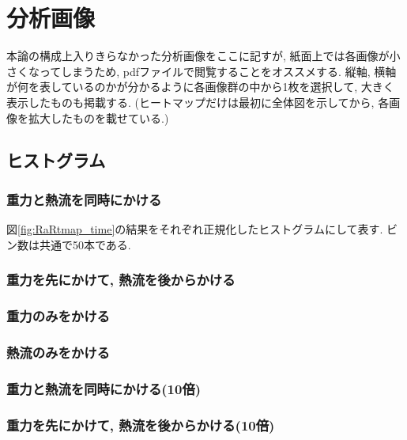 \chapter{分析画像}\label{ap:analysis}

本論の構成上入りきらなかった分析画像をここに記すが, 紙面上では各画像が小さくなってしまうため, pdfファイルで閲覧することをオススメする. 縦軸, 横軸が何を表しているのかが分かるように各画像群の中から1枚を選択して, 大きく表示したものも掲載する. (ヒートマップだけは最初に全体図を示してから, 各画像を拡大したものを載せている.)

\section{ヒストグラム}

\subsection{重力と熱流を同時にかける}

図\ref{fig:RaRtmap_time}の結果をそれぞれ正規化したヒストグラムにして表す. ビン数は共通で50本である.



\subsection{重力を先にかけて, 熱流を後からかける}



\subsection{重力のみをかける} 

 

\subsection{熱流のみをかける}



\subsection{重力と熱流を同時にかける(10倍)}



\subsection{重力を先にかけて, 熱流を後からかける(10倍)}

